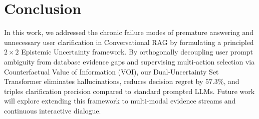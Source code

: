 \section{Conclusion}
\label{sec:conclusion}

In this work, we addressed the chronic failure modes of premature answering and unnecessary user clarification in Conversational RAG by formulating a principled $2 \times 2$ Epistemic Uncertainty framework. By orthogonally decoupling user prompt ambiguity from database evidence gaps and supervising multi-action selection via Counterfactual Value of Information (VOI), our Dual-Uncertainty Set Transformer eliminates hallucinations, reduces decision regret by $57.3\%$, and triples clarification precision compared to standard prompted LLMs. Future work will explore extending this framework to multi-modal evidence streams and continuous interactive dialogue.
